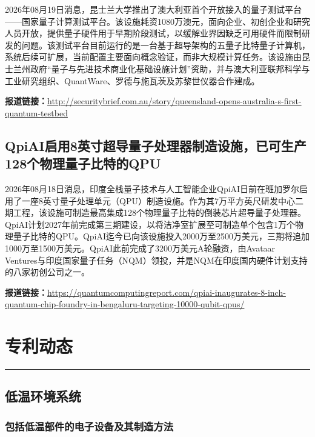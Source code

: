 \documentclass[12pt,a4paper]{ctexart}
\begin{document}
2026年08月19日消息，昆士兰大学推出了澳大利亚首个开放接入的量子测试平台——国家量子计算测试平台。该设施耗资1080万澳元，面向企业、初创企业和研究人员开放，提供量子硬件用于早期阶段测试，以缓解业界因缺乏可用硬件而限制研发的问题。该测试平台目前运行的是一台基于超导架构的五量子比特量子计算机，系统后续可扩展，当前配置主要面向概念验证，而非大规模计算任务。该设施由昆士兰州政府“量子与先进技术商业化基础设施计划”资助，并与澳大利亚联邦科学与工业研究组织、QuantWare、罗德与施瓦茨及苏黎世仪器合作建成。

\noindent\textbf{报道链接：}\url{http://securitybrief.com.au/story/queensland-opens-australia-s-first-quantum-testbed}

\subsection{ QpiAI启用8英寸超导量子处理器制造设施，已可生产128个物理量子比特的QPU }

2026年08月18日消息，印度全栈量子技术与人工智能企业QpiAI日前在班加罗尔启用了一座8英寸量子处理单元（QPU）制造设施。作为其7万平方英尺研发中心二期工程，该设施可制造最高集成128个物理量子比特的倒装芯片超导量子处理器。QpiAI计划2027年前完成第三期建设，以将洁净室扩展至可制造单个包含1万个物理量子比特的QPU。QpiAI迄今已向该设施投入2000万至2500万美元，三期将追加1000万至1500万美元。QpiAI此前完成了3200万美元A轮融资，由Avataar Ventures与印度国家量子任务（NQM）领投，并是NQM在印度国内硬件计划支持的八家初创公司之一。

\noindent\textbf{报道链接：}\url{https://quantumcomputingreport.com/qpiai-inaugurates-8-inch-quantum-chip-foundry-in-bengaluru-targeting-10000-qubit-qpus/}



\newpage
\section{专利动态}
\vspace{-0.5em}
\noindent\rule{\linewidth}{1.5pt}

\subsection{ 低温环境系统 }

\subsubsection{ 包括低温部件的电子设备及其制造方法 }
\end{document}
